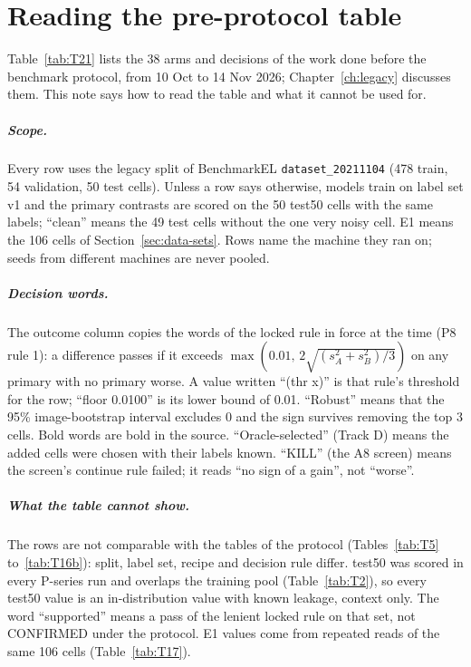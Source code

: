 \chapter{Reading the pre-protocol table}\label{app:t21}

Table~\ref{tab:T21} lists the 38 arms and decisions of the work done before the benchmark protocol, from 10 Oct to 14 Nov 2026;
Chapter~\ref{ch:legacy} discusses them. This note says how to read the table and what it cannot be used for.

\paragraph{Scope.} Every row uses the legacy split of BenchmarkEL \texttt{dataset\_20211104} (478 train, 54 validation, 50 test
cells). Unless a row says otherwise, models train on label set v1 and the primary contrasts are scored on the 50 test50 cells with
the same labels; ``clean'' means the 49 test cells without the one very noisy cell. E1 means the 106 cells of
Section~\ref{sec:data-sets}. Rows name the machine they ran on; seeds from different machines are never pooled.

\paragraph{Decision words.} The outcome column copies the words of the locked rule in force at the time (P8 rule 1): a difference
passes if it exceeds $\max(0.01,\, 2\sqrt{(s_A^2 + s_B^2)/3})$ on any primary with no primary worse. A value written ``(thr x)'' is that
rule's threshold for the row; ``floor 0.0100'' is its lower bound of 0.01. ``Robust'' means that the 95\% image-bootstrap interval
excludes 0 and the sign survives removing the top 3 cells. Bold words are bold in the source. ``Oracle-selected'' (Track D) means the
added cells were chosen with their labels known. ``KILL'' (the A8 screen) means the screen's continue rule failed; it reads ``no sign
of a gain'', not ``worse''.

\paragraph{What the table cannot show.} The rows are not comparable with the tables of the protocol (Tables~\ref{tab:T5}
to~\ref{tab:T16b}): split, label set, recipe and decision rule differ. test50 was scored in every P-series run and overlaps the
training pool (Table~\ref{tab:T2}), so every test50 value is an in-distribution value with known leakage, context only. The word
``supported'' means a pass of the lenient locked rule on that set, not CONFIRMED under the protocol. E1 values come from repeated
reads of the same 106 cells (Table~\ref{tab:T17}).

